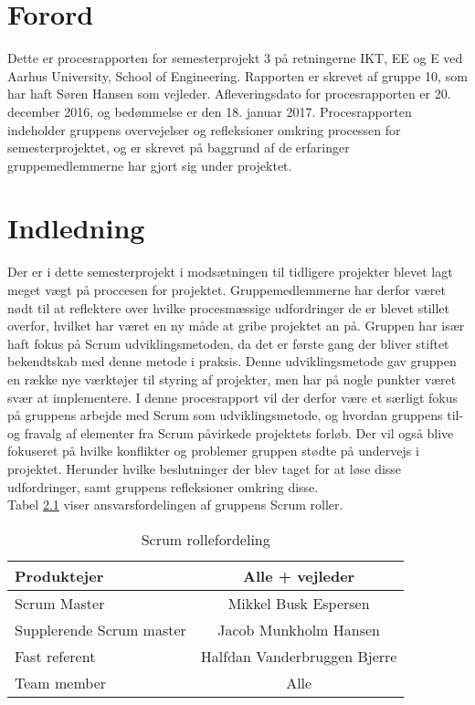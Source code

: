 \chapter{Forord}
Dette er procesrapporten for semesterprojekt 3 på retningerne IKT, EE og E ved Aarhus University, School of Engineering. Rapporten er skrevet af gruppe 10, som har haft Søren Hansen som vejleder. Afleveringsdato for procesrapporten er 20. december 2016, og bedømmelse er den 18. januar 2017. Procesrapporten indeholder gruppens overvejelser og refleksioner omkring processen for semesterprojektet, og er skrevet på baggrund af de erfaringer gruppemedlemmerne har gjort sig under projektet.    

\chapter{Indledning}
Der er i dette semesterprojekt i modsætningen til tidligere projekter blevet lagt meget vægt på proccesen for projektet. Gruppemedlemmerne har derfor været nødt til at reflektere over hvilke procesmæssige udfordringer de er blevet stillet overfor, hvilket har været en ny måde at gribe projektet an på. Gruppen har især haft fokus på Scrum udviklingsmetoden, da det er første gang der bliver stiftet bekendtskab med denne metode i praksis. Denne udviklingsmetode gav gruppen en række nye værktøjer til styring af projekter, men har på nogle punkter været svær at implementere. I denne procesrapport vil der derfor være et særligt fokus på gruppens arbejde med Scrum som udviklingsmetode, og hvordan gruppens til- og fravalg af elementer fra Scrum påvirkede projektets forløb. Der vil også blive fokuseret på hvilke konflikter og problemer gruppen stødte på undervejs i projektet. Herunder hvilke beslutninger der blev taget for at løse disse udfordringer, samt gruppens refleksioner omkring disse.
\\
Tabel \ref{roller} viser ansvarsfordelingen af gruppens Scrum roller. \\

\begin{table}
	\centering
	\begin{tabular}{| l | c |}
		\hline
		Produktejer & Alle + vejleder\\
		\hline
		Scrum Master & Mikkel Busk Espersen\\
		\hline
		Supplerende Scrum master & Jacob Munkholm Hansen\\
		\hline
		Fast referent & Halfdan Vanderbruggen Bjerre\\
		\hline
		Team member & Alle\\
		\hline
	\end{tabular}
	\caption{Scrum rollefordeling}
	\label{roller}
\end{table}

